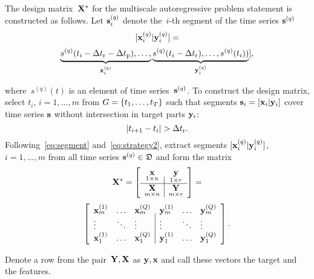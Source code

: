 \documentclass[conference]{IEEEtran}
\begin{document}
The design matrix~${\mathbf{X}}^*$ for the multiscale autoregressive problem statement is constructed  as follows. Let ${\mathbf{s}}^{(q)}_i$ denote the~$i$-th segment of the time series ${\mathbf{s}}^{(q)}$
\begin{equation}\label{eq:segment}
[\bx^{(q)}_i | \by^{(q)}_i] = \end{equation}
\[ \underbrace{s^{(q)}(t_i-\Delta t_\text{r}-\Delta t_\text{p}),\dots,}_{{\mathbf{x}}^{(q)}_i} \underbrace{s^{(q)}(t_i-\Delta t_\text{r}),\dots,s^{(q)}(t_i))}_{{\mathbf{y}}^{(q)}_i}], \]

where~$s^{(q)}(t)$ is an element of time series~${\mathbf{s}}^{(q)}$. To construct the design matrix, select $t_i$, $i = 1, \dots, m$ from $G = \{t_1, \dots, t_T\}$ such that segments ${\mathbf{s}}_i = [{\mathbf{x}}_i|{\mathbf{y}}_i]$ cover time series ${\mathbf{s}}$
without intersection in target parts  ${\mathbf{y}}_i$:
\begin{equation}\label{eq:strategy2} |t_{i+1} - t_i| > \dtr.
\end{equation}
Following~\eqref{eq:segment} and~\eqref{eq:strategy2}, extract segments $[{\mathbf{x}}^{(q)}_i | {\mathbf{y}}^{(q)}_i]$, $i = 1, \dots, m$ from all time series ${\mathbf{s}}^{(q)} \in {\mathfrak{D}}$ and form the matrix
 \begin{equation}\label{eq:design_matrix}
\bX^*= \left[
\begin{array}{c|c}
\underset{1{\times}n}{\x} & \underset{1{\times}r}{{\by}}  \\
\hline
 \underset{m{\times}n}\bX & \underset{m{\times}r}\bY  \\
 \end{array}
\right] = \end{equation}
\[ \left[
\begin{array}{lll|lll}
{\mathbf{x}}_m^{(1)}  & \dots & {\mathbf{x}}_m^{(Q)} & {\mathbf{y}}_m^{(1)} &  \dots & {\mathbf{y}}_m^{(Q)}   \\
\vdots & \ddots & \vdots & \vdots & \ddots & \vdots  \\
{\mathbf{x}}_1^{(1)} & \dots & {\mathbf{x}}_1^{(Q)} & {\mathbf{y}}_1^{(1)}  & \dots & {\mathbf{y}}_1^{(Q)}   \\


\end{array}
\right]. \]

Denote a row from the pair~$\mathbf{Y},{\mathbf{X}}$ as ${\mathbf{y}},{\mathbf{x}}$ and call these vectors the target and the features.
\end{document}
